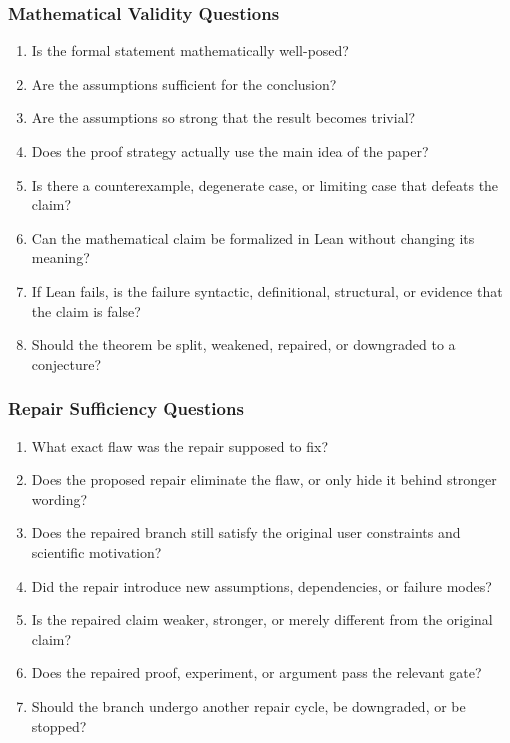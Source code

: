 \documentclass[11pt]{article}
\begin{document}
\subsubsection*{Mathematical Validity Questions}
\begin{enumerate}[leftmargin=*]
    \item Is the formal statement mathematically well-posed?
    \item Are the assumptions sufficient for the conclusion?
    \item Are the assumptions so strong that the result becomes trivial?
    \item Does the proof strategy actually use the main idea of the paper?
    \item Is there a counterexample, degenerate case, or limiting case that defeats the claim?
    \item Can the mathematical claim be formalized in Lean without changing its meaning?
    \item If Lean fails, is the failure syntactic, definitional, structural, or evidence that the claim is false?
    \item Should the theorem be split, weakened, repaired, or downgraded to a conjecture?
\end{enumerate}

\subsubsection*{Repair Sufficiency Questions}
\begin{enumerate}[leftmargin=*]
    \item What exact flaw was the repair supposed to fix?
    \item Does the proposed repair eliminate the flaw, or only hide it behind stronger wording?
    \item Does the repaired branch still satisfy the original user constraints and scientific motivation?
    \item Did the repair introduce new assumptions, dependencies, or failure modes?
    \item Is the repaired claim weaker, stronger, or merely different from the original claim?
    \item Does the repaired proof, experiment, or argument pass the relevant gate?
    \item Should the branch undergo another repair cycle, be downgraded, or be stopped?
\end{enumerate}
\end{document}
